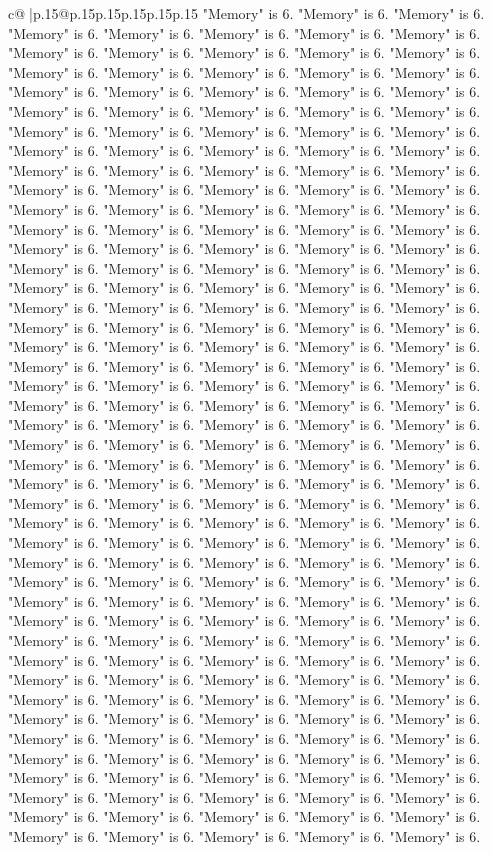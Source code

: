 \documentclass{article}
\begin{document}
{\begin{supertabular}{c@{$\;$}|p{.15\linewidth}@{}p{.15\linewidth}p{.15\linewidth}p{.15\linewidth}p{.15\linewidth}p{.15\linewidth}}
{{{"Memory" is 6. "Memory" is 6. "Memory" is 6. "Memory" is 6. "Memory" is 6. "Memory" is 6. "Memory" is 6. "Memory" is 6. "Memory" is 6. "Memory" is 6. "Memory" is 6. "Memory" is 6. "Memory" is 6. "Memory" is 6. "Memory" is 6. "Memory" is 6. "Memory" is 6. "Memory" is 6. "Memory" is 6. "Memory" is 6. "Memory" is 6. "Memory" is 6. "Memory" is 6. "Memory" is 6. "Memory" is 6. "Memory" is 6. "Memory" is 6. "Memory" is 6. "Memory" is 6. "Memory" is 6. "Memory" is 6. "Memory" is 6. "Memory" is 6. "Memory" is 6. "Memory" is 6. "Memory" is 6. "Memory" is 6. "Memory" is 6. "Memory" is 6. "Memory" is 6. "Memory" is 6. "Memory" is 6. "Memory" is 6. "Memory" is 6. "Memory" is 6. "Memory" is 6. "Memory" is 6. "Memory" is 6. "Memory" is 6. "Memory" is 6. "Memory" is 6. "Memory" is 6. "Memory" is 6. "Memory" is 6. "Memory" is 6. "Memory" is 6. "Memory" is 6. "Memory" is 6. "Memory" is 6. "Memory" is 6. "Memory" is 6. "Memory" is 6. "Memory" is 6. "Memory" is 6. "Memory" is 6. "Memory" is 6. "Memory" is 6. "Memory" is 6. "Memory" is 6. "Memory" is 6. "Memory" is 6. "Memory" is 6. "Memory" is 6. "Memory" is 6. "Memory" is 6. "Memory" is 6. "Memory" is 6. "Memory" is 6. "Memory" is 6. "Memory" is 6. "Memory" is 6. "Memory" is 6. "Memory" is 6. "Memory" is 6. "Memory" is 6. "Memory" is 6. "Memory" is 6. "Memory" is 6. "Memory" is 6. "Memory" is 6. "Memory" is 6. "Memory" is 6. "Memory" is 6. "Memory" is 6. "Memory" is 6. "Memory" is 6. "Memory" is 6. "Memory" is 6. "Memory" is 6. "Memory" is 6. "Memory" is 6. "Memory" is 6. "Memory" is 6. "Memory" is 6. "Memory" is 6. "Memory" is 6. "Memory" is 6. "Memory" is 6. "Memory" is 6. "Memory" is 6. "Memory" is 6. "Memory" is 6. "Memory" is 6. "Memory" is 6. "Memory" is 6. "Memory" is 6. "Memory" is 6. "Memory" is 6. "Memory" is 6. "Memory" is 6. "Memory" is 6. "Memory" is 6. "Memory" is 6. "Memory" is 6. "Memory" is 6. "Memory" is 6. "Memory" is 6. "Memory" is 6. "Memory" is 6. "Memory" is 6. "Memory" is 6. "Memory" is 6. "Memory" is 6. "Memory" is 6. "Memory" is 6. "Memory" is 6. "Memory" is 6. "Memory" is 6. "Memory" is 6. "Memory" is 6. "Memory" is 6. "Memory" is 6. "Memory" is 6. "Memory" is 6. "Memory" is 6. "Memory" is 6. "Memory" is 6. "Memory" is 6. "Memory" is 6. "Memory" is 6. "Memory" is 6. "Memory" is 6. "Memory" is 6. "Memory" is 6. "Memory" is 6. "Memory" is 6. "Memory" is 6. "Memory" is 6. "Memory" is 6. "Memory" is 6. "Memory" is 6. "Memory" is 6. "Memory" is 6. "Memory" is 6. "Memory" is 6. "Memory" is 6. "Memory" is 6. "Memory" is 6. "Memory" is 6. "Memory" is 6. "Memory" is 6. "Memory" is 6. "Memory" is 6. "Memory" is 6. "Memory" is 6. "Memory" is 6. "Memory" is 6. "Memory" is 6. "Memory" is 6. "Memory" is 6. "Memory" is 6. "Memory" is 6. "Memory" is 6. "Memory" is 6. "Memory" is 6. "Memory" is 6. "Memory" is 6. "Memory" is 6. "Memory" is 6. "Memory" is 6. "Memory" is 6. "Memory" is 6. "Memory" is 6. "Memory" is 6. "Memory" is 6. "Memory" is 6. "Memory" is 6. "Memory" is 6. "Memory" is 6. "Memory" is 6. "Memory" is 6. "Memory" is 6. "Memory" is 6. "Memory" is 6. "Memory" is 6. "Memory" is 6. "Memory" is 6. "Memory" is 6. "Memory" is 6. "Memory" is 6. "Memory" is 6. "Memory" is 6. "Memory" is 6. }}}
\end{supertabular}}
\end{document}

